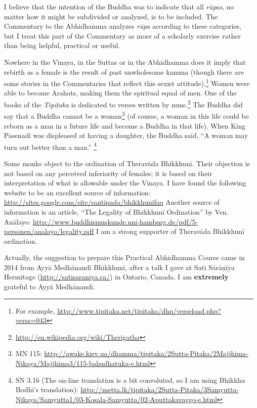 
I believe that the intention of the Buddha was to indicate that all \textit{rūpas}, no matter how it might be subdivided or analyzed, is to be included. The Commentary to the Abhidhamma analyzes \textit{rūpa} according to these categories, but I treat this part of the Commentary as more of a scholarly exercise rather than being helpful, practical or useful.


Nowhere in the Vinaya, in the Suttas or in the Abhidhamma does it imply that rebirth as a female is the result of past unwholesome kamma (though there are some stories in the Commentaries that reflect this sexist attitude).\footnote{For example, \url{http://www.tipitaka.net/tipitaka/dhp/verseload.php?verse=043}} Women were able to become Arahats, making them the spiritual equal of men. One of the books of the \textit{Tipiṭaka} is dedicated to verses written by nuns.\footnote{\url{http://en.wikipedia.org/wiki/Therigatha}} The Buddha did say that a Buddha cannot be a woman\footnote{MN 115: \url{http://awake.kiev.ua/dhamma/tipitaka/2Sutta-Pitaka/2Majjhima-Nikaya/Majjhima3/115-bahudhatuka-e.html}} (of course, a woman in this life could be reborn as a man in a future life and become a Buddha in that life). When King Pasenadi was displeased at having a daughter, the Buddha said, “A woman may turn out better than a man.” \footnote{SN 3.16 (The on-line translation is a bit convoluted, so I am using Bhikkhu Bodhi’s translation): \url{http://metta.lk/tipitaka/2Sutta-Pitaka/3Samyutta-Nikaya/Samyutta1/03-Kosala-Samyutta/02-Aputtakavaggo-e.html}}

Some monks object to the ordination of Theravāda Bhikkhunī. Their objection is not based on any perceived inferiority of females; it is based on their interpretation of what is allowable under the Vinaya. I have found the following website to be an excellent source of information: \url{http://sites.google.com/site/santipada/bhikkhunifaq} Another source of information is an article, “The Legality of Bhikkhunī Ordination” by Ven. Anālayo: \url{http://www.buddhismuskunde.uni-hamburg.de/pdf/5-personen/analayo/legality.pdf} I am a strong supporter of Theravāda Bhikkhunī ordination. 

Actually, the suggestion to prepare this Practical Abhidhamma Course came in 2014 from Ayyā Medhānandī Bhikkhunī, after a talk I gave at Sati Sārāņīya Hermitage (\url{http://satisaraniya.ca/}) in Ontario, Canada. I am \textbf{extremely} grateful to Ayyā Medhānandī.